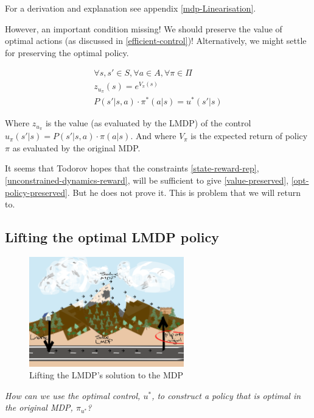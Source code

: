 For a derivation and explanation see appendix \ref{mdp-Linearisation}.

However, an important condition missing!
We should preserve the value of optimal actions (as discussed in \ref{efficient-control})!
Alternatively, we might settle for preserving the optimal policy.

\begin{align*}
\forall s, s' \in S, \forall a \in A, \forall \pi \in \Pi \\
z_{u_{\pi}}(s) = e^{V_{\pi}(s)} \label{value-preserved}\tag{value} \\
P(s'|s, a) \cdot \pi^{* }(a|s) = u^{* }(s'|s) \label{opt-policy-preserved}\tag{optimal policy}
\end{align*}

Where $z_{u_{\pi}}$ is the value (as evaluated by the LMDP) of the control $u_{\pi}(s'|s) = P(s'|s, a) \cdot \pi(a|s)$.
And where $V_{\pi}$ is the expected return of policy $\pi$ as evaluated by the original MDP.

It seems that Todorov hopes that the constraints \ref{state-reward-rep}, \ref{unconstrained-dynamics-reward},
will be sufficient to give \ref{value-preserved}, \ref{opt-policy-preserved}. But he does not prove it.
This is problem that we will return to.

\subsection{Lifting the optimal LMDP policy}

\begin{figure}[h!]
\centering
\includegraphics[width=0.6\textwidth,height=0.3\textheight]{../../pictures/drawings/abstract-representations-project.png}
\caption{Lifting the LMDP's solution to the MDP}
\end{figure}

\begin{displayquote}
\textsl{How can we use the optimal control, $u^{* }$, to construct a policy that is optimal in the original MDP, $\pi_{u^* }$?}
\end{displayquote}

